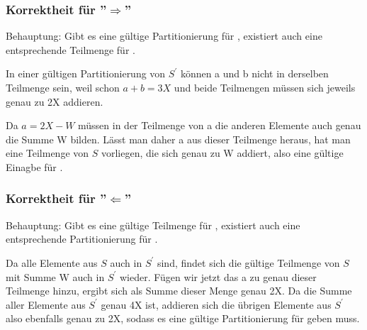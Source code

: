 \documentclass[a4paper]{article}
\begin{document}
			\subsubsection{Korrektheit für ''$\Rightarrow$''}
			Behauptung: Gibt es eine gültige Partitionierung für \numberpartition , existiert auch eine entsprechende Teilmenge für \subsetsum .\n
			
			In einer gültigen Partitionierung von $S^\prime$ können a und b nicht in derselben Teilmenge sein, weil schon $a + b = 3X$ und beide Teilmengen müssen sich jeweils genau zu 2X addieren.\n
			
			Da $a = 2X - W$ müssen in der Teilmenge von a die anderen Elemente  auch genau die Summe W bilden. Lässt man daher a aus dieser Teilmenge heraus, hat man eine Teilmenge von $S$ vorliegen, die sich genau zu W addiert, also eine gültige Einagbe für \subsetsum .
			
			\subsubsection{Korrektheit für ''$\Leftarrow$''}
			Behauptung: Gibt es eine gültige Teilmenge für \subsetsum , existiert auch eine entsprechende Partitionierung für \numberpartition .\n

			Da alle Elemente aus $S$ auch in $S^\prime$ sind, findet sich die gültige Teilmenge von $S$ mit Summe W auch in $S^\prime$ wieder.	
			Fügen wir jetzt das a zu genau dieser Teilmenge hinzu, ergibt sich  als Summe dieser Menge genau 2X. \n
			Da die Summe aller Elemente aus $S^\prime$ genau 4X ist, addieren sich die übrigen Elemente aus $S^\prime$ also ebenfalls genau zu 2X, sodass es eine gültige Partitionierung für \numberpartition geben muss.
\end{document}

